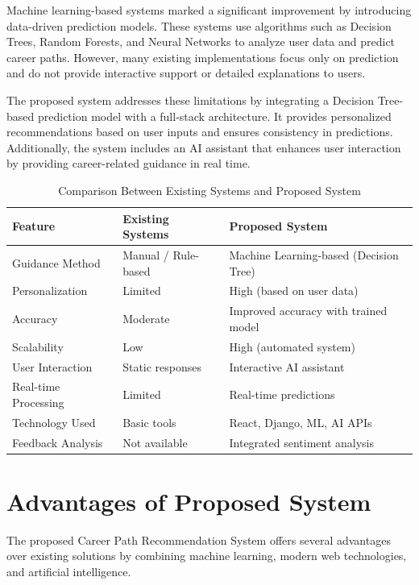 \documentclass[12pt,a4paper]{report}
\begin{document}
{Machine learning-based systems marked a significant improvement by introducing data-driven prediction models. These systems use algorithms such as Decision Trees, Random Forests, and Neural Networks to analyze user data and predict career paths. However, many existing implementations focus only on prediction and do not provide interactive support or detailed explanations to users.

The proposed system addresses these limitations by integrating a Decision Tree-based prediction model with a full-stack architecture. It provides personalized recommendations based on user inputs and ensures consistency in predictions. Additionally, the system includes an AI assistant that enhances user interaction by providing career-related guidance in real time.

\begin{table}[h]
\centering
\caption{Comparison Between Existing Systems and Proposed System}
\begin{tabular}{|p{4cm}|p{5cm}|p{5cm}|}
\hline
\textbf{Feature} & \textbf{Existing Systems} & \textbf{Proposed System} \\
\hline
Guidance Method & Manual / Rule-based & Machine Learning-based (Decision Tree) \\
\hline
Personalization & Limited & High (based on user data) \\
\hline
Accuracy & Moderate & Improved accuracy with trained model \\
\hline
Scalability & Low & High (automated system) \\
\hline
User Interaction & Static responses & Interactive AI assistant \\
\hline
Real-time Processing & Limited & Real-time predictions \\
\hline
Technology Used & Basic tools & React, Django, ML, AI APIs \\
\hline
Feedback Analysis & Not available & Integrated sentiment analysis \\
\hline
\end{tabular}
\end{table}

\section{Advantages of Proposed System}

The proposed Career Path Recommendation System offers several advantages over existing solutions by combining machine learning, modern web technologies, and artificial intelligence.

}
\end{document}
